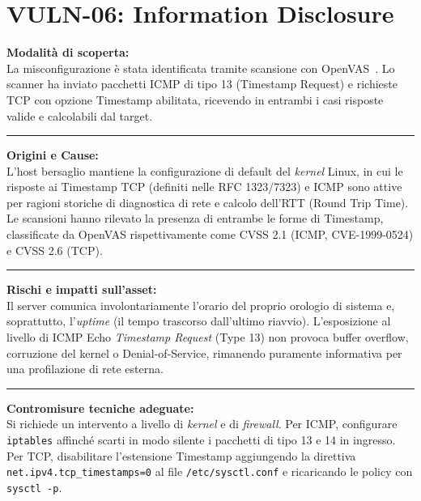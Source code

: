 \documentclass[11pt]{report}
\begin{document}
	\section{VULN-06: Information Disclosure}
	\begin{tcolorbox}[colback=gray!5, colframe=headerblue, arc=3pt, boxrule=0.8pt, breakable]
		\textbf{Modalità di scoperta:}\\
		La misconfigurazione è stata identificata tramite scansione con OpenVAS~\cite{openvas-docs}. Lo scanner ha inviato pacchetti ICMP di tipo 13 (Timestamp Request) e richieste TCP con opzione Timestamp abilitata, ricevendo in entrambi i casi risposte valide e calcolabili dal target.
		
		\vspace{0.2cm}\hrule\vspace{0.2cm}
		
		\textbf{Origini e Cause:}\\
		L'host bersaglio mantiene la configurazione di default del \textit{kernel} Linux, in cui le risposte ai Timestamp TCP (definiti nelle RFC 1323/7323) e ICMP sono attive per ragioni storiche di diagnostica di rete e calcolo dell'RTT (Round Trip Time). Le scansioni hanno rilevato la presenza di entrambe le forme di Timestamp, classificate da OpenVAS rispettivamente come CVSS 2.1 (ICMP, CVE-1999-0524) e CVSS 2.6 (TCP).
		
		\vspace{0.2cm}\hrule\vspace{0.2cm}
		
		\textbf{Rischi e impatti sull'asset:}\\
		Il server comunica involontariamente l'orario del proprio orologio di sistema e, soprattutto, l'\textit{uptime} (il tempo trascorso dall'ultimo riavvio). L'esposizione al livello di ICMP Echo \textit{Timestamp Request} (Type 13) non provoca buffer overflow, corruzione del kernel o Denial-of-Service, rimanendo puramente informativa per una profilazione di rete esterna.
		
		\vspace{0.2cm}\hrule\vspace{0.2cm}
		
		\textbf{Contromisure tecniche adeguate:}\\
		Si richiede un intervento a livello di \textit{kernel} e di \textit{firewall}. Per ICMP, configurare \texttt{iptables} affinché scarti in modo silente i pacchetti di tipo 13 e 14 in ingresso. Per TCP, disabilitare l'estensione Timestamp aggiungendo la direttiva \texttt{net.ipv4.tcp\_timestamps=0} al file \texttt{/etc/sysctl.conf} e ricaricando le policy con \texttt{sysctl -p}.
	\end{tcolorbox}
	
\end{document}
